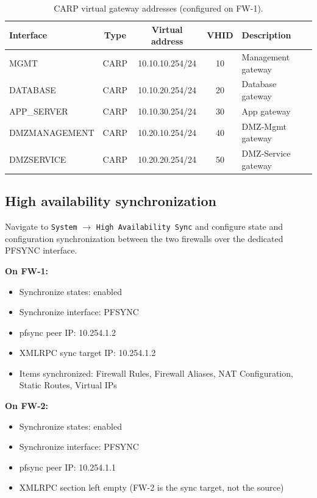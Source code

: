 \begin{table}[htbp]
    \centering
    \small
    \caption{CARP virtual gateway addresses (configured on FW-1).}
    \label{tab:fw-carp}
    \begin{tabular}{|l|c|c|c|l|}
        \hline
        \textbf{Interface} & \textbf{Type} & \textbf{Virtual address} & \textbf{VHID} & \textbf{Description} \\
        \hline
        MGMT & CARP & 10.10.10.254/24 & 10 & Management gateway \\
        DATABASE & CARP & 10.10.20.254/24 & 20 & Database gateway \\
        APP\_SERVER & CARP & 10.10.30.254/24 & 30 & App gateway \\
        DMZMANAGEMENT & CARP & 10.20.10.254/24 & 40 & DMZ-Mgmt gateway \\
        DMZSERVICE & CARP & 10.20.20.254/24 & 50 & DMZ-Service gateway \\
        \hline
    \end{tabular}
\end{table}

\subsection{High availability synchronization}

Navigate to \texttt{System} $\rightarrow$ \texttt{High Availability Sync} and configure state and configuration synchronization between the two firewalls over the dedicated PFSYNC interface.

\textbf{On FW-1:}
\begin{itemize}[nosep]
    \item Synchronize states: enabled
    \item Synchronize interface: PFSYNC
    \item pfsync peer IP: 10.254.1.2
    \item XMLRPC sync target IP: 10.254.1.2
    \item Items synchronized: Firewall Rules, Firewall Aliases, NAT Configuration, Static Routes, Virtual IPs
\end{itemize}

\textbf{On FW-2:}
\begin{itemize}[nosep]
    \item Synchronize states: enabled
    \item Synchronize interface: PFSYNC
    \item pfsync peer IP: 10.254.1.1
    \item XMLRPC section left empty (FW-2 is the sync target, not the source)
\end{itemize}

